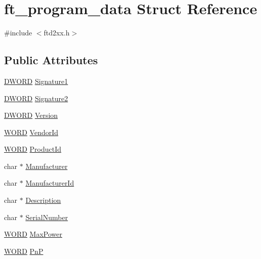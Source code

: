 \hypertarget{structft__program__data}{
\section{ft\_\-program\_\-data Struct Reference}
\label{structft__program__data}
}


{\ttfamily \#include $<$ftd2xx.h$>$}\subsection*{Public Attributes}
\begin{DoxyCompactItemize}
\item 
\hyperlink{LALUsbx64_2include_2WinTypes_8h_ad342ac907eb044443153a22f964bf0af}{DWORD} \hyperlink{structft__program__data_a6b26e04c691ec5944d2fffec797c399a}{Signature1}
\item 
\hyperlink{LALUsbx64_2include_2WinTypes_8h_ad342ac907eb044443153a22f964bf0af}{DWORD} \hyperlink{structft__program__data_ab28a0f4509093050f1927f1e946f3d9f}{Signature2}
\item 
\hyperlink{LALUsbx64_2include_2WinTypes_8h_ad342ac907eb044443153a22f964bf0af}{DWORD} \hyperlink{structft__program__data_a9ef2eb59fe9ef1699df92a9d50ac3a81}{Version}
\item 
\hyperlink{LALUsbx64_2include_2WinTypes_8h_a197942eefa7db30960ae396d68339b97}{WORD} \hyperlink{structft__program__data_a4d4e65a934b3a822d90d2b2fc461cb11}{VendorId}
\item 
\hyperlink{LALUsbx64_2include_2WinTypes_8h_a197942eefa7db30960ae396d68339b97}{WORD} \hyperlink{structft__program__data_a623b7980fadab4322ed41da598b45397}{ProductId}
\item 
char $\ast$ \hyperlink{structft__program__data_a803860e98c4c7be38685b9c69e4684a5}{Manufacturer}
\item 
char $\ast$ \hyperlink{structft__program__data_a2e84082e1e7b7c8e117c19a536813da5}{ManufacturerId}
\item 
char $\ast$ \hyperlink{structft__program__data_a254c31fdadcc3ce3748f6682083874a8}{Description}
\item 
char $\ast$ \hyperlink{structft__program__data_a81ddee025aa0fa0b48189fb0ee7c5b46}{SerialNumber}
\item 
\hyperlink{LALUsbx64_2include_2WinTypes_8h_a197942eefa7db30960ae396d68339b97}{WORD} \hyperlink{structft__program__data_a95bf98d9c0b056d68078bc2d2f66b20e}{MaxPower}
\item 
\hyperlink{LALUsbx64_2include_2WinTypes_8h_a197942eefa7db30960ae396d68339b97}{WORD} \hyperlink{structft__program__data_ac7072dcb805fa05b3614f000498a8aed}{PnP}

\end{DoxyCompactItemize}
